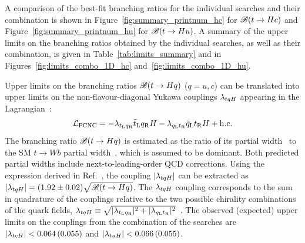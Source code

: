 A comparison of the best-fit branching ratios for the individual searches and their combination is shown in Figure~\ref{fig:summary_printnum_hc} 
for $\mathscr{B}(t\to Hc)$ and Figure~\ref{fig:summary_printnum_hu} for $\mathscr{B}(t\to Hu)$.
A summary of the upper limits on the branching ratios obtained by the individual searches, as well as their combination, is given  
in Table~\ref{tab:limits_summary} and in Figures~\ref{fig:limits_combo_1D_hc} and~\ref{fig:limits_combo_1D_hu}.


Upper limits on the branching ratios $\mathscr{B}(t\to Hq)$ ($q=u,c$) can be translated into upper limits on the non-flavour-diagonal Yukawa couplings $\lambda_{tqH}$ 
appearing in the Lagrangian~\cite{Harnik:2012pb}:
\begin{equation*}
{\cal L}_\mathrm{FCNC} = -\lambda_{t_\mathrm{L} q_\mathrm{R}} \bar{t}_\mathrm{L} q_\mathrm{R} H - \lambda_{q_\mathrm{L} t_\mathrm{R}} \bar{q}_\mathrm{L} t_\mathrm{R} H  + \mathrm{h.c.}
\end{equation*}
The branching ratio $\mathscr{B}(t\to Hq)$ is estimated as the ratio of its partial width~\cite{Zhang:2013xya} to the SM $t \to Wb$ partial width~\cite{Denner:1990ns}, 
which is assumed to be dominant. Both predicted partial widths include next-to-leading-order QCD corrections.
Using the expression derived in Ref.~\cite{Aad:2014dya}, the coupling $|\lambda_{tqH}|$ can be extracted as $| \lambda_{tqH} | = (1.92 \pm 0.02) \sqrt{\mathscr{B}(t\to Hq)}$.
The $\lambda_{tqH}$ coupling corresponds to the sum in quadrature of the couplings relative to the two possible chirality combinations of the quark fields, 
$\lambda_{tqH} \equiv \sqrt{ |\lambda_{t_\mathrm{L} q_\mathrm{R}}|^2 +   |\lambda_{q_\mathrm{L} t_\mathrm{R}}|^2 }$~\cite{Harnik:2012pb}.
The observed (expected) upper limits on the couplings from the combination of the searches are $|\lambda_{tcH}|<0.064\,(0.055)$ and $|\lambda_{tuH}|<0.066\,(0.055)$.

